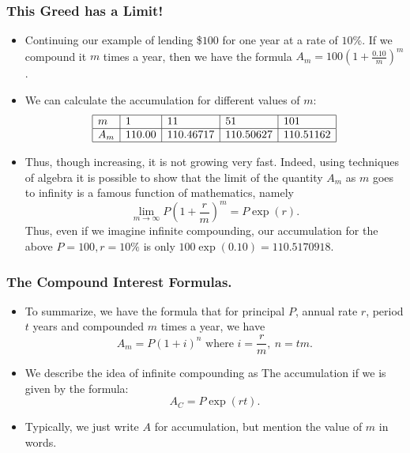 %



\begin{frame}%
 \frametitle{This Greed has a Limit!}
  \begin{itemize}%
 
\item Continuing our example of lending \$$100$ for one year at a rate
of $10$\%. If we compound it $m$ times a year, then we
have the formula $A_m = 100\left(1+\frac{0.10}{m}\right)^m$.

\item We can calculate the
accumulation for different values of $m$:
$$\begin{array}{|l|l|l|l|l|}
\hline
m & 1 & 11 &   51 &  101\\\hline
A_m & 110.00 & 110.46717 & 110.50627 & 110.51162\\\hline
\end{array}
$$

\item Thus, though increasing, it is not growing very fast. Indeed,
using techniques of algebra it is possible to show that the limit of the
quantity $A_m$ as $m$ goes to infinity is a famous function of
mathematics, namely
$$\lim_{m\rightarrow \infty} P\left(1+\frac{r}{m}\right)^m = P\exp(r).$$
Thus, even if we imagine infinite compounding, our accumulation for the
above $P=100, r=10\%$ is only $100\exp(0.10) = 110.5170918$.

  
\end{itemize}
\end{frame}

%


\begin{frame}%
  \frametitle{The Compound Interest Formulas.}
  \begin{itemize}%

\item To summarize, we have the formula that for principal $P$, annual rate
$r$, period $t$ years and compounded $m$ times a year, we have
$$A_m =P(1+i)^n \mbox{ where } i=\frac{r}{m}, ~ n= tm .$$

\item We describe the idea of infinite compounding as
The accumulation if we  is given by the formula:
$$A_C = P\exp(rt).$$
\item Typically, we just write $A$ for accumulation, but mention the
value of $m$ in words.


\end{itemize}
\end{frame}
%



